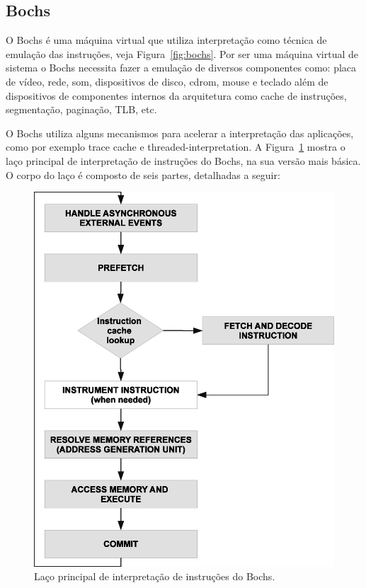 \documentclass[11pt,twoside]{article}
\begin{document}
\subsection{Bochs}

O Bochs é uma máquina virtual que utiliza interpretação como técnica
de emulação das instruções, veja Figura~\ref{fig:bochs}. Por ser uma
máquina virtual de sistema o Bochs necessita fazer a emulação de
diversos componentes como: placa de vídeo, rede, som, dispositivos de
disco, cdrom, mouse e teclado além de dispositivos de componentes
internos da arquitetura como cache de instruções, segmentação,
paginação, TLB, etc.

O Bochs utiliza alguns mecanismos para acelerar a interpretação das
aplicações, como por exemplo trace cache e threaded-interpretation.  A
Figura~\ref{fig:bochs_loop} mostra o laço principal de interpretação
de instruções do Bochs, na sua versão mais básica. O corpo do laço é
composto de seis partes, detalhadas a seguir:

\begin{figure}[!h]
  	\begin{center}
    	\includegraphics[scale=0.5]{figures/bochs_loop.eps}
	\end{center}
	\caption{Laço principal de interpretação de instruções do Bochs.}
	\label{fig:bochs_loop}
\end{figure}
\end{document}
